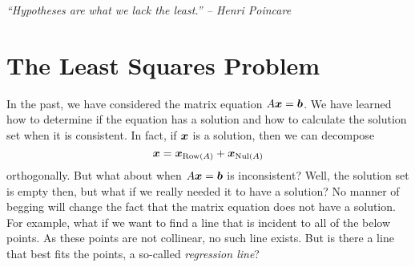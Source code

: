 \begin{center} 
\emph{``Hypotheses are what we lack the least.'' --  Henri Poincare}
\end{center}

\section{The Least Squares Problem}\label{sec:least}
In the past, we have considered the matrix equation $A\boldsymbol x = \boldsymbol b$. We have learned how to determine if the equation has a solution and how to calculate the solution set when it is consistent. In fact, if $\boldsymbol x$ is a solution, then we can decompose \[\boldsymbol x = \boldsymbol x_{\operatorname*{Row}(A)} + \boldsymbol x_{\operatorname{Nul}(A)}\] orthogonally. But what about when $A\boldsymbol x = \boldsymbol b$ is inconsistent? Well, the solution set is empty then, but what if we really needed it to have a solution? No manner of begging will change the fact that the matrix equation does not have a solution. For example, what if we want to find a line that is incident to all of the below points. As these points are not collinear, no such line exists. But is there a line that best fits the points, a so-called \emph{regression line}? 
